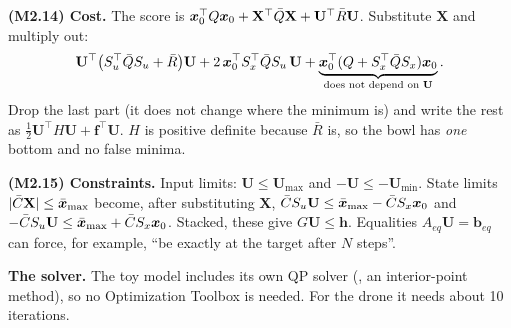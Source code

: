 \textbf{(M2.14) Cost.} The score is $\bm{x}_0^\top Q\bm{x}_0+\mathbf X^\top\bar Q\mathbf X+\mathbf U^\top\bar R\mathbf U$. Substitute $\mathbf X$
and multiply out:
\[
\mathbf U^\top\big(S_u^\top\bar QS_u+\bar R\big)\mathbf U+2\,\bm{x}_0^\top S_x^\top\bar QS_u\,\mathbf U+\underbrace{\bm{x}_0^\top(Q+S_x^\top\bar QS_x)\bm{x}_0}_{\text{does not depend on }\mathbf U}.
\]
Drop the last part (it does not change where the minimum is) and write the rest as $\tfrac12\mathbf U^\top H\mathbf U+\bm f^\top\mathbf U$.
$H$ is positive definite because $\bar R$ is, so the bowl has \emph{one} bottom and no false minima.

\textbf{(M2.15) Constraints.} Input limits: $\mathbf U\le\mathbf U_{\max}$ and $-\mathbf U\le-\mathbf U_{\min}$. State limits
$|\bar C\mathbf X|\le\bar{\bm{x}}_{\max}$ become, after substituting $\mathbf X$, $\bar CS_u\mathbf U\le\bar{\bm{x}}_{\max}-\bar CS_x\bm{x}_0$ and
$-\bar CS_u\mathbf U\le\bar{\bm{x}}_{\max}+\bar CS_x\bm{x}_0$. Stacked, these give $G\mathbf U\le\bm h$. Equalities $A_{eq}\mathbf U=\bm b_{eq}$
can force, for example, ``be exactly at the target after $N$ steps''.

\textbf{The solver.} The toy model includes its own QP solver (, an interior-point method), so no
Optimization Toolbox is needed. For the drone it needs about 10 iterations.

